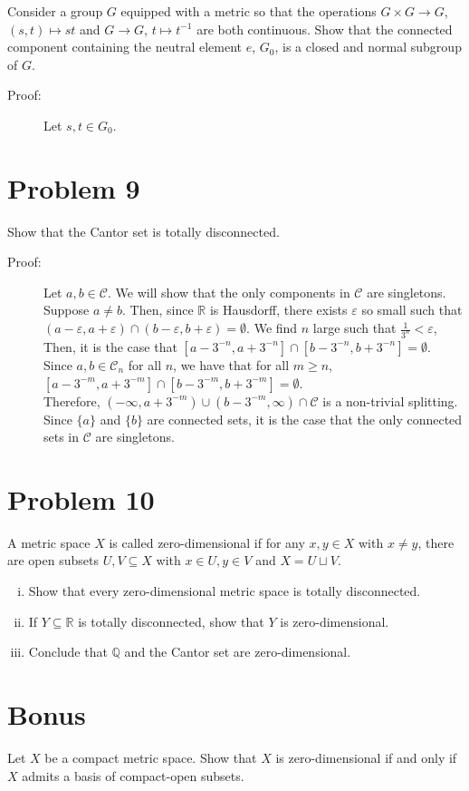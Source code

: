 \documentclass[8pt]{extarticle}
\newcommand{\Q}{\mathbb{Q}}
\newcommand{\R}{\mathbb{R}}
\begin{document}
  Consider a group $G$ equipped with a metric so that the operations $G\times G \rightarrow G$, $(s,t)\mapsto st$ and $G\rightarrow G$, $t\mapsto t^{-1}$ are both continuous. Show that the connected component containing the neutral element $e$, $G_0$, is a closed and normal subgroup of $G$.
  \begin{description}
    \item[Proof:] Let $s,t\in G_0$.
  \end{description}
  \section{Problem 9}%
  Show that the Cantor set is totally disconnected.
  \begin{description}
    \item[Proof:] Let $a,b\in \mathcal{C}$. We will show that the only components in $\mathcal{C}$ are singletons.\\

      Suppose $a\neq b$. Then, since $\R$ is Hausdorff, there exists $\varepsilon$ so small such that $(a-\varepsilon,a+\varepsilon) \cap (b-\varepsilon,b+\varepsilon) = \emptyset$. We find $n$ large such that $\frac{1}{3^n} < \varepsilon$, Then, it is the case that $[a-3^{-n},a+3^{-n}] \cap [b-3^{-n},b+3^{-n}] = \emptyset$.\\

      Since $a,b\in \mathcal{C}_n$ for all $n$, we have that for all $m\geq n$, $[a-3^{-m},a+3^{-m}] \cap [b-3^{-m},b+3^{-m}] = \emptyset$.\\

      Therefore, $(-\infty,a+3^{-m}) \cup (b-3^{-m},\infty)\cap \mathcal{C}$ is a non-trivial splitting.\\

      Since $\{a\}$ and $\{b\}$ are connected sets, it is the case that the only connected sets in $\mathcal{C}$ are singletons.
  \end{description}
  \section{Problem 10}%
  A metric space $X$ is called zero-dimensional if for any $x,y\in X$ with $x\neq y$, there are open subsets $U,V\subseteq X$ with $x\in U,y\in V$ and $X = U\sqcup V$.
  \begin{enumerate}[(i)]
    \item Show that every zero-dimensional metric space is totally disconnected.
    \item If $Y\subseteq \R$ is totally disconnected, show that $Y$ is zero-dimensional.
    \item Conclude that $\Q$ and the Cantor set are zero-dimensional.
  \end{enumerate}
  \section{Bonus}%
  Let $X$ be a compact metric space. Show that $X$ is zero-dimensional if and only if $X$ admits a basis of compact-open subsets.
\end{document}
